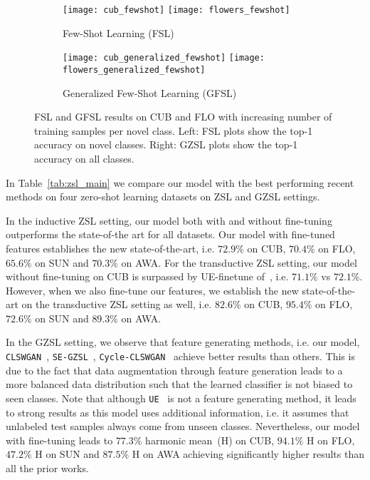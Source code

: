 \documentclass[10pt,twocolumn,letterpaper]{article}
\newcommand{\myparagraph}[1]{\vspace{5pt}\noindent{\bf #1}}
\begin{document}
\begin{figure*}[t]
	\centering
    \begin{subfigure}[b]{0.49\textwidth}
        \texttt{[image: cub\_fewshot]} 
        \texttt{[image: flowers\_fewshot]} 
        \caption{Few-Shot Learning (FSL)}
        \end{subfigure}
     \begin{subfigure}[b]{0.49\textwidth}
        \texttt{[image: cub\_generalized\_fewshot]} 
        \texttt{[image: flowers\_generalized\_fewshot]} 
        \caption{Generalized Few-Shot Learning (GFSL)}
        \end{subfigure}
    	\caption{FSL and GFSL results on CUB and FLO with increasing number of training samples per novel class. Left: FSL plots show the top-1 accuracy on novel classes. Right: GZSL plots show the top-1 accuracy on all classes.} 
\label{fig:fewshot}
\end{figure*}


\myparagraph{Comparing with the state-of-the-art.} In Table~\ref{tab:zsl_main} we compare our model with the best performing recent methods on four zero-shot learning datasets on ZSL and GZSL settings. 

In the inductive ZSL setting, our model both with and without fine-tuning outperforms the state-of-the art for all datasets. Our model with fine-tuned features establishes the new state-of-the-art, i.e. $72.9\%$ on CUB, $70.4\%$ on FLO, $65.6\%$ on SUN and $70.3\%$ on AWA. For the transductive ZSL setting, our model without fine-tuning on CUB is surpassed by UE-finetune of~\cite{song2018transductive}, i.e. $71.1\%$ vs $72.1\%$. However, when we also fine-tune our features, we establish the new state-of-the-art on the transductive ZSL setting as well, i.e. $82.6\%$ on CUB, $95.4\%$ on FLO, $72.6\%$ on SUN and $89.3\%$ on AWA.

In the GZSL setting, we observe that feature generating methods, i.e. our model, \texttt{CLSWGAN}~\cite{XLSA18}, \texttt{SE-GZSL}~\cite{Verma_2018_CVPR}, \texttt{Cycle-CLSWGAN}~\cite{FKRC18} achieve better results than others. This is due to the fact that data augmentation through feature generation leads to a more balanced data distribution such that the learned classifier is not biased to seen classes. Note that although \texttt{UE}~\cite{song2018transductive} is not a feature generating method, it leads to strong results as this model uses additional information, i.e. it assumes that unlabeled test samples always come from unseen classes. Nevertheless, our model with fine-tuning leads to $77.3\%$ harmonic mean~(H) on CUB, $94.1\%$ H on FLO, $47.2\%$ H on SUN and $87.5\%$ H on AWA achieving significantly higher results than all the prior works.
\end{document}
